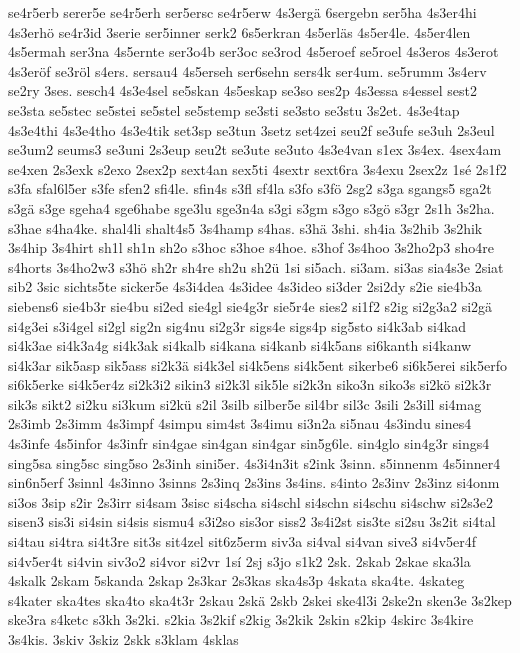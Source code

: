 {se4r5erb
serer5e
se4r5erh
ser5ersc
se4r5erw
4s3ergä
6sergebn
ser5ha
4s3er4hi
4s3erhö
se4r3id
3serie
ser5inner
serk2
6s5erkran
4s5erläs
4s5er4le.
4s5er4len
4s5ermah
ser3na
4s5ernte
ser3o4b
ser3oc
se3rod
4s5eroef
se5roel
4s3eros
4s3erot
4s3eröf
se3röl
s4ers.
sersau4
4s5erseh
ser6sehn
sers4k
ser4um.
se5rumm
3s4erv
se2ry
3ses.
sesch4
4s3e4sel
se5skan
4s5eskap
se3so
ses2p
4s3essa
s4essel
sest2
se3sta
se5stec
se5stei
se5stel
se5stemp
se3sti
se3sto
se3stu
3s2et.
4s3e4tap
4s3e4thi
4s3e4tho
4s3e4tik
set3sp
se3tun
3setz
set4zei
seu2f
se3ufe
se3uh
2s3eul
se3um2
seums3
se3uni
2s3eup
seu2t
se3ute
se3uto
4s3e4van
s1ex
3s4ex.
4sex4am
se4xen
2s3exk
s2exo
2sex2p
sext4an
sex5ti
4sextr
sext6ra
3s4exu
2sex2z
1sé
2s1f2
s3fa
sfal6l5er
s3fe
sfen2
sfi4le.
sfin4s
s3fl
sf4la
s3fo
s3fö
2sg2
s3ga
sgangs5
sga2t
s3gä
s3ge
sgeha4
sge6habe
sge3lu
sge3n4a
s3gi
s3gm
s3go
s3gö
s3gr
2s1h
3s2ha.
s3hae
s4ha4ke.
shal4li
shalt4s5
3s4hamp
s4has.
s3hä
3shi.
sh4ia
3s2hib
3s2hik
3s4hip
3s4hirt
sh1l
sh1n
sh2o
s3hoc
s3hoe
s4hoe.
s3hof
3s4hoo
3s2ho2p3
sho4re
s4horts
3s4ho2w3
s3hö
sh2r
sh4re
sh2u
sh2ü
1si
si5ach.
si3am.
si3as
sia4s3e
2siat
sib2
3sic
sichts5te
sicker5e
4s3i4dea
4s3idee
4s3ideo
si3der
2si2dy
s2ie
sie4b3a
siebens6
sie4b3r
sie4bu
si2ed
sie4gl
sie4g3r
sie5r4e
sies2
si1f2
s2ig
si2g3a2
si2gä
si4g3ei
s3i4gel
si2gl
sig2n
sig4nu
si2g3r
sigs4e
sigs4p
sig5sto
si4k3ab
si4kad
si4k3ae
si4k3a4g
si4k3ak
si4kalb
si4kana
si4kanb
si4k5ans
si6kanth
si4kanw
si4k3ar
sik5asp
sik5ass
si2k3ä
si4k3el
si4k5ens
si4k5ent
sikerbe6
si6k5erei
sik5erfo
si6k5erke
si4k5er4z
si2k3i2
sikin3
si2k3l
sik5le
si2k3n
siko3n
siko3s
si2kö
si2k3r
sik3s
sikt2
si2ku
si3kum
si2kü
s2il
3silb
silber5e
sil4br
sil3c
3sili
2s3ill
si4mag
2s3imb
2s3imm
4s3impf
4simpu
sim4st
3s4imu
si3n2a
si5nau
4s3indu
sines4
4s3infe
4s5infor
4s3infr
sin4gae
sin4gan
sin4gar
sin5g6le.
sin4glo
sin4g3r
sings4
sing5sa
sing5sc
sing5so
2s3inh
sini5er.
4s3i4n3it
s2ink
3sinn.
s5innenm
4s5inner4
sin6n5erf
3sinnl
4s3inno
3sinns
2s3inq
2s3ins
3s4ins.
s4into
2s3inv
2s3inz
si4onm
si3os
3sip
s2ir
2s3irr
si4sam
3sisc
si4scha
si4schl
si4schn
si4schu
si4schw
si2s3e2
sisen3
sis3i
si4sin
si4sis
sismu4
s3i2so
sis3or
siss2
3s4i2st
sis3te
si2su
3s2it
si4tal
si4tau
si4tra
si4t3re
sit3s
sit4zel
sit6z5erm
siv3a
si4val
si4van
sive3
si4v5er4f
si4v5er4t
si4vin
siv3o2
si4vor
si2vr
1sí
2sj
s3jo
s1k2
2sk.
2skab
2skae
ska3la
4skalk
2skam
5skanda
2skap
2s3kar
2s3kas
ska4s3p
4skata
ska4te.
4skateg
s4kater
ska4tes
ska4to
ska4t3r
2skau
2skä
2skb
2skei
ske4l3i
2ske2n
sken3e
3s2kep
ske3ra
s4ketc
s3kh
3s2ki.
s2kia
3s2kif
s2kig
3s2kik
2skin
s2kip
4skirc
3s4kire
3s4kis.
3skiv
3skiz
2skk
s3klam
4sklas
}

